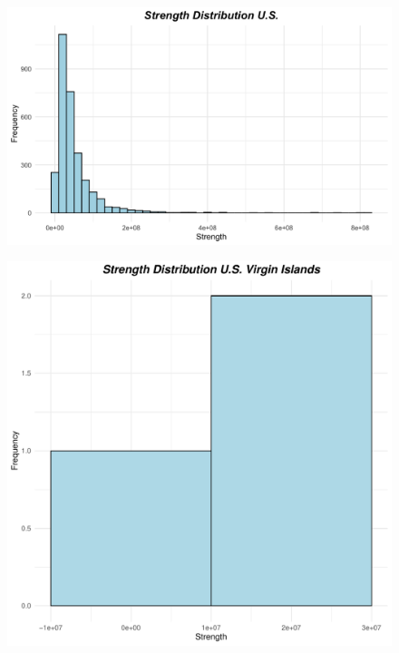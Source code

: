 \begin{figure}[h]
\begin{minipage}[t]{0.65\linewidth}
\centering
\includegraphics[width=\textwidth]{images/task43/U.S./strength_distibution_US.png} 
    \label{U.S.:strength}
\end{minipage}
\hfill
\begin{minipage}[t]{0.4\linewidth}
\includegraphics[width=\textwidth, page=17]{images/task43/strenght_plots.pdf} 
    \label{Virginia:strength}
\end{minipage}
\end{figure} 










